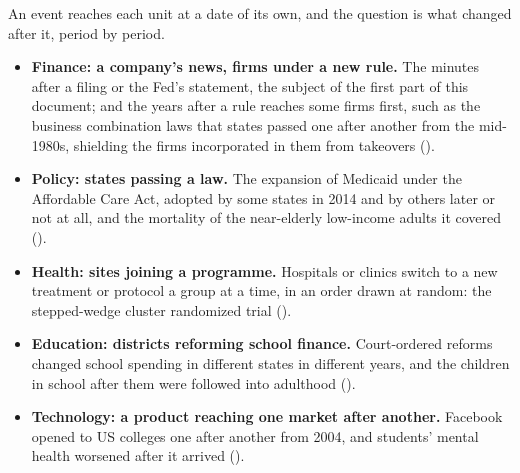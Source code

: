 An event reaches each unit at a date of its own, and the question is what changed after it, period by period.
\begin{itemize}
  \item \textbf{Finance: a company's news, firms under a new rule.} The minutes after a filing or the Fed's statement,
    the subject of the first part of this document; and the years after a rule reaches some firms first, such as the
    business combination laws that states passed one after another from the mid-1980s, shielding the firms
    incorporated in them from takeovers ().
  \item \textbf{Policy: states passing a law.} The expansion of Medicaid under the Affordable Care Act, adopted by some
    states in 2014 and by others later or not at all, and the mortality of the near-elderly low-income adults it
    covered ().
  \item \textbf{Health: sites joining a programme.} Hospitals or clinics switch to a new treatment or protocol a group at
    a time, in an order drawn at random: the stepped-wedge cluster randomized trial ().
  \item \textbf{Education: districts reforming school finance.} Court-ordered reforms changed school spending in
    different states in different years, and the children in school after them were followed into adulthood
    ().
  \item \textbf{Technology: a product reaching one market after another.} Facebook opened to US colleges one after
    another from 2004, and students' mental health worsened after it arrived ().
\end{itemize}

